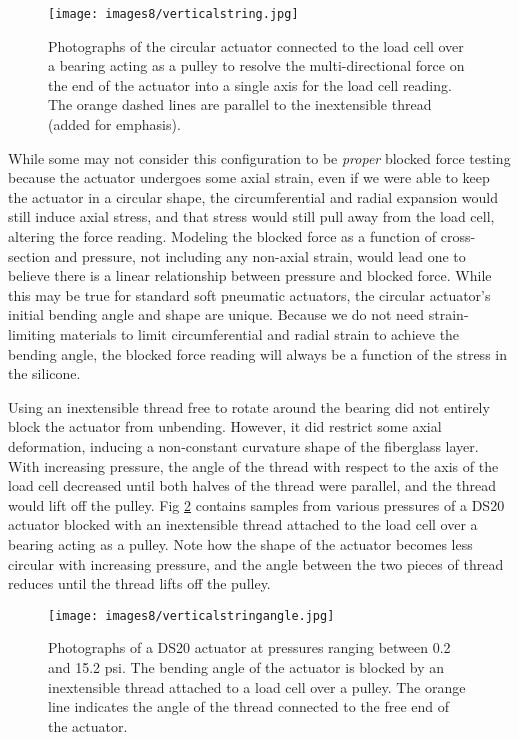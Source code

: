 \begin{figure}[ht]
    \centering
     \texttt{[image: images8/verticalstring.jpg]}
    \caption{Photographs of the circular actuator connected to the load cell over a bearing acting as a pulley to resolve the multi-directional force on the end of the actuator into a single axis for the load cell reading. The orange dashed lines are parallel to the inextensible thread (added for emphasis).}
    \label{fig:verticalstring}
\end{figure}

While some may not consider this configuration to be \emph{proper} blocked force testing because the actuator undergoes some axial strain, even if we were able to keep the actuator in a circular shape, the circumferential and radial expansion would still induce axial stress, and that stress would still pull away from the load cell, altering the force reading. Modeling the blocked force as a function of cross-section and pressure, not including any non-axial strain, would lead one to believe there is a linear relationship between pressure and blocked force. While this may be true for standard soft pneumatic actuators, the circular actuator's initial bending angle and shape are unique. Because we do not need strain-limiting materials to limit circumferential and radial strain to achieve the bending angle, the blocked force reading will always be a function of the stress in the silicone. 

Using an inextensible thread free to rotate around the bearing did not entirely block the actuator from unbending. However, it did restrict some axial deformation, inducing a non-constant curvature shape of the fiberglass layer. With increasing pressure, the angle of the thread with respect to the axis of the load cell decreased until both halves of the thread were parallel, and the thread would lift off the pulley. Fig \ref{fig:verticalstringangle} contains samples from various pressures of a DS20 actuator blocked with an inextensible thread attached to the load cell over a bearing acting as a pulley. Note how the shape of the actuator becomes less circular with increasing pressure, and the angle between the two pieces of thread reduces until the thread lifts off the pulley. 

\begin{figure}[ht]
    \centering
     \texttt{[image: images8/verticalstringangle.jpg]}
    \caption{Photographs of a DS20 actuator at pressures ranging between 0.2 and 15.2 psi. The bending angle of the actuator is blocked by an inextensible thread attached to a load cell over a pulley. The orange line indicates the angle of the thread connected to the free end of the actuator.}
    \label{fig:verticalstringangle}
\end{figure}

